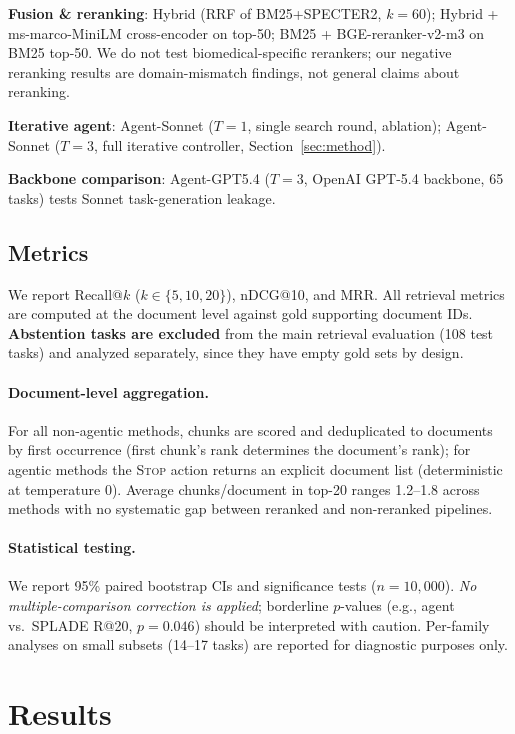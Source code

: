\documentclass{article}
\begin{document}
\textbf{Fusion \& reranking}: Hybrid (RRF of BM25+SPECTER2, $k{=}60$); Hybrid + ms-marco-MiniLM cross-encoder on top-50; BM25 + BGE-reranker-v2-m3 on BM25 top-50. We do not test biomedical-specific rerankers; our negative reranking results are domain-mismatch findings, not general claims about reranking.

\textbf{Iterative agent}: Agent-Sonnet ($T{=}1$, single search round, ablation); Agent-Sonnet ($T{=}3$, full iterative controller, Section~\ref{sec:method}).

\textbf{Backbone comparison}: Agent-GPT5.4 ($T{=}3$, OpenAI GPT-5.4 backbone, 65 tasks) tests Sonnet task-generation leakage.

\subsection{Metrics}

We report Recall@$k$ ($k \in \{5, 10, 20\}$), nDCG@10, and MRR. All retrieval metrics are computed at the document level against gold supporting document IDs. \textbf{Abstention tasks are excluded} from the main retrieval evaluation (108 test tasks) and analyzed separately, since they have empty gold sets by design.

\paragraph{Document-level aggregation.} For all non-agentic methods, chunks are scored and deduplicated to documents by first occurrence (first chunk's rank determines the document's rank); for agentic methods the \textsc{Stop} action returns an explicit document list (deterministic at temperature 0). Average chunks/document in top-20 ranges 1.2--1.8 across methods with no systematic gap between reranked and non-reranked pipelines.

\paragraph{Statistical testing.} We report 95\% paired bootstrap CIs and significance tests ($n{=}10{,}000$). \emph{No multiple-comparison correction is applied}; borderline $p$-values (e.g., agent vs.\ SPLADE R@20, $p{=}0.046$) should be interpreted with caution. Per-family analyses on small subsets (14--17 tasks) are reported for diagnostic purposes only.

\section{Results}
\label{sec:results}
\end{document}
